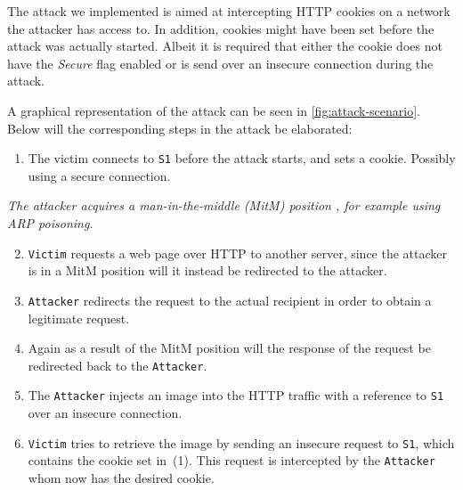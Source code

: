 The attack we implemented is aimed at intercepting HTTP cookies on a network the attacker has access to. In addition, cookies might have been set before the attack was actually started. Albeit it is required that either the cookie does not have the \emph{Secure} flag enabled or is send over an insecure connection during the attack.

A graphical representation of the attack can be seen in \autoref{fig:attack-scenario}. Below will the corresponding steps in the attack be elaborated:
\begin{enumerate}
	\item The victim connects to \texttt{S1} before the attack starts, and sets a cookie. Possibly using a secure connection.
\end{enumerate}

\noindent \emph{The attacker acquires a man-in-the-middle (MitM) position%
, for example using ARP poisoning.}
\begin{enumerate}
	\setcounter{enumi}{1}
	\item \texttt{Victim} requests a web page over HTTP to another server, since the attacker is in a MitM position will it instead be redirected to the attacker.
	\item \texttt{Attacker} redirects the request to the actual recipient in order to obtain a legitimate request.
	\item Again as a result of the MitM position will the response of the request be redirected back to the \texttt{Attacker}.
	\item The \texttt{Attacker} injects an image into the HTTP traffic with a reference to \texttt{S1} over an insecure connection.
	\item \texttt{Victim} tries to retrieve the image by sending an insecure request to \texttt{S1}, which contains the cookie set in~(1). This request is intercepted by the \texttt{Attacker} whom now has the desired cookie.
\end{enumerate}

